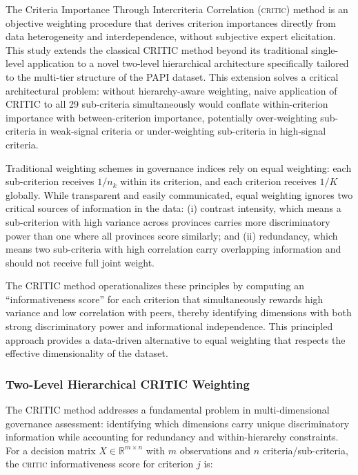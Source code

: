 \documentclass[12pt,a4paper]{article}
\newcommand{\CRITIC}{\textsc{critic}\xspace}
\begin{document}
The Criteria Importance Through Intercriteria Correlation (\CRITIC) method \citep{Diakoulaki1995} is an objective weighting procedure that derives criterion importances directly from data heterogeneity and interdependence, without subjective expert elicitation. This study extends the classical CRITIC method beyond its traditional single-level application to a novel two-level hierarchical architecture specifically tailored to the multi-tier structure of the PAPI dataset. This extension solves a critical architectural problem: without hierarchy-aware weighting, naive application of CRITIC to all 29 sub-criteria simultaneously would conflate within-criterion importance with between-criterion importance, potentially over-weighting sub-criteria in weak-signal criteria or under-weighting sub-criteria in high-signal criteria.

Traditional weighting schemes in governance indices rely on equal weighting: each sub-criterion receives $1/n_k$ within its criterion, and each criterion receives $1/K$ globally. While transparent and easily communicated, equal weighting ignores two critical sources of information in the data: (i) contrast intensity, which means a sub-criterion with high variance across provinces carries more discriminatory power than one where all provinces score similarly; and (ii) redundancy, which means two sub-criteria with high correlation carry overlapping information and should not receive full joint weight.

The CRITIC method operationalizes these principles by computing an ``informativeness score'' for each criterion that simultaneously rewards high variance and low correlation with peers, thereby identifying dimensions with both strong discriminatory power and informational independence. This principled approach provides a data-driven alternative to equal weighting that respects the effective dimensionality of the dataset.

\subsubsection{Two-Level Hierarchical CRITIC Weighting}

The CRITIC method addresses a fundamental problem in multi-dimensional governance assessment: identifying which dimensions carry unique discriminatory information while accounting for redundancy and within-hierarchy constraints. For a decision matrix $X \in \mathbb{R}^{m \times n}$ with $m$ observations and $n$ criteria/sub-criteria, the \CRITIC informativeness score for criterion $j$ is:
\end{document}
